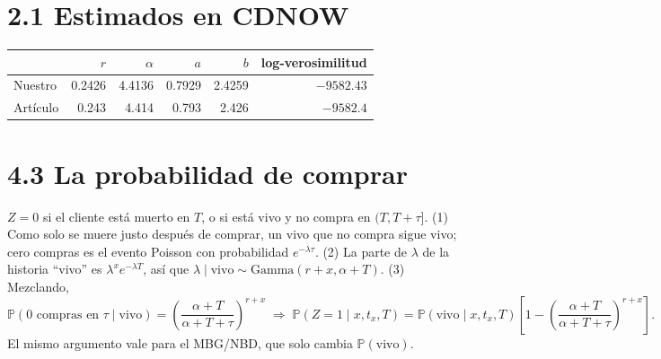 \documentclass[11pt]{article}
\begin{document}
\section*{2.1 Estimados en CDNOW}
\begin{center}
\begin{tabular}{lrrrrr}
\toprule
 & $r$ & $\alpha$ & $a$ & $b$ & log-verosimilitud\\\midrule
Nuestro & 0.2426 & 4.4136 & 0.7929 & 2.4259 & $-9582.43$\\
Artículo & 0.243 & 4.414 & 0.793 & 2.426 & $-9582.4$\\\bottomrule
\end{tabular}
\end{center}

\section*{4.3 La probabilidad de comprar}
$Z=0$ si el cliente está muerto en $T$, o si está vivo y no compra en $(T,T+\tau]$. (1) Como solo se muere justo después de comprar, un vivo que no compra sigue vivo; cero compras es el evento Poisson con probabilidad $e^{-\lambda\tau}$. (2) La parte de $\lambda$ de la historia ``vivo'' es $\lambda^xe^{-\lambda T}$, así que $\lambda\mid\text{vivo}\sim\text{Gamma}(r+x,\alpha+T)$. (3) Mezclando,
\[\mathbb{P}(\text{0 compras en }\tau\mid\text{vivo})=\left(\frac{\alpha+T}{\alpha+T+\tau}\right)^{r+x}
\;\Longrightarrow\;
\mathbb{P}(Z=1\mid x,t_x,T)=\mathbb{P}(\text{vivo}\mid x,t_x,T)\left[1-\left(\frac{\alpha+T}{\alpha+T+\tau}\right)^{r+x}\right].\]
El mismo argumento vale para el MBG/NBD, que solo cambia $\mathbb{P}(\text{vivo})$.
\end{document}
